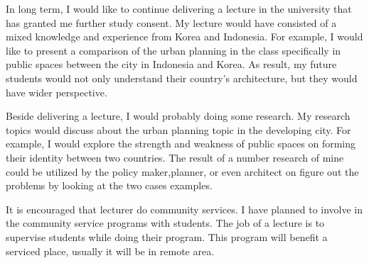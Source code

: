 \documentclass[12pt]{simart} %
\begin{document}
In long term, I would like to continue delivering a lecture in the university that has granted me further study consent. My lecture would have consisted of a mixed knowledge and experience from Korea and Indonesia. For example, I would like to present a comparison of the urban planning in the class specifically in public spaces between the city in Indonesia and Korea. As result, my future students would not only understand their country's architecture, but they would have wider perspective.

Beside delivering a lecture, I would probably doing some research. My research topics would discuss about the urban planning topic in the developing city. For example, I would explore the strength and weakness of public spaces on forming their identity between two countries. The result of a number research of mine could be utilized by the policy maker,planner, or even architect on figure out the problems by looking at the two cases examples.

It is encouraged that lecturer do community services. I have planned to involve in the community service programs with students. The job of a lecture is to supervise students while doing their program. This program will benefit a serviced place, usually it will be in remote area.


%

%
\end{document}
